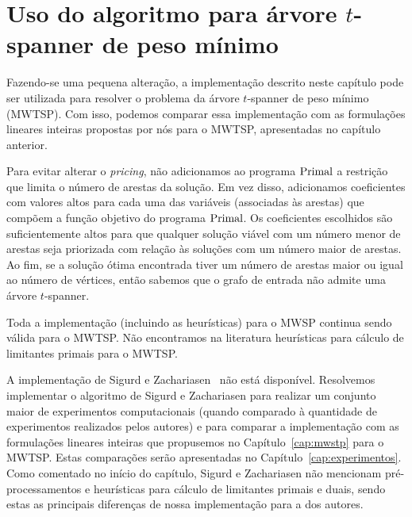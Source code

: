 \section{Uso do algoritmo para árvore $t$-spanner de peso mínimo}
\label{sec:gc_mwtsp}

Fazendo-se uma pequena alteração, a implementação descrito 
neste capítulo pode ser utilizada para resolver o problema
da árvore $t$-spanner de peso mínimo (MWTSP). Com isso, podemos
comparar essa implementação com as formulações lineares inteiras propostas
por nós para o MWTSP, apresentadas no capítulo anterior. 

Para evitar alterar o \emph{pricing}, não adicionamos ao
programa $\rm{Primal}$ a restrição que limita o número de arestas da
solução. Em vez disso, adicionamos coeficientes com valores
altos para cada uma das variáveis (associadas às arestas) que compõem
a função objetivo do programa $\rm{Primal}$.
Os coeficientes escolhidos são suficientemente altos para que qualquer
solução viável com um número menor de arestas seja priorizada com
relação às soluções com um número maior de arestas. Ao fim, se a solução ótima
encontrada tiver um número de arestas maior ou igual ao número de
vértices, então sabemos que o grafo de entrada não admite uma árvore
$t$-spanner.

Toda a implementação (incluindo as heurísticas) para o MWSP continua sendo
válida para o MWTSP. Não encontramos na literatura heurísticas
para cálculo de limitantes primais para o MWTSP.

A implementação de Sigurd e Zachariasen~\cite{SigurdZ2004} não está disponível.
Resolvemos implementar o algoritmo de Sigurd e Zachariasen para realizar
um conjunto maior de experimentos computacionais (quando comparado à quantidade
de
experimentos realizados pelos autores) e para comparar a implementação com as
formulações
lineares inteiras que propusemos no Capítulo~\ref{cap:mwstp} para o MWTSP.
Estas comparações serão apresentadas no Capítulo~\ref{cap:experimentos}.
Como comentado no início do capítulo, Sigurd e Zachariasen não mencionam 
pré-processamentos e heurísticas para cálculo de limitantes primais e duais,
sendo estas as principais diferenças de nossa implementação para a dos
autores.

